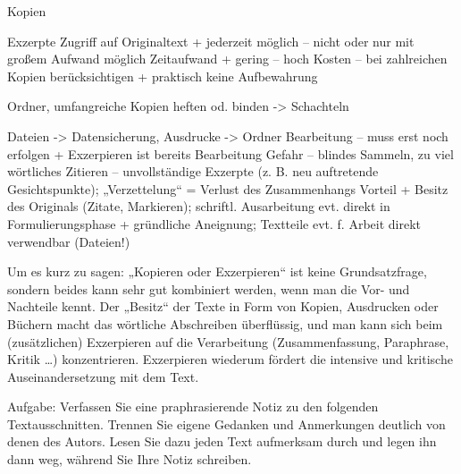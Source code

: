 \documentclass[]{book}
\theoremstyle{definition}
\theoremstyle{definition}
\theoremstyle{definition}
\theoremstyle{remark}
\begin{document}
Kopien

Exzerpte Zugriff auf Originaltext + jederzeit möglich -- nicht oder nur
mit großem Aufwand möglich Zeitaufwand + gering -- hoch Kosten -- bei
zahlreichen Kopien berücksichtigen + praktisch keine Aufbewahrung

Ordner, umfangreiche Kopien heften od. binden -\textgreater{} Schachteln

Dateien -\textgreater{} Datensicherung, Ausdrucke -\textgreater{} Ordner
Bearbeitung -- muss erst noch erfolgen + Exzerpieren ist bereits
Bearbeitung Gefahr -- blindes Sammeln, zu viel wörtliches Zitieren --
unvollständige Exzerpte (z. B. neu auftretende Gesichtspunkte);
„Verzettelung`` = Verlust des Zusammenhangs Vorteil + Besitz des
Originals (Zitate, Markieren); schriftl. Ausarbeitung evt. direkt in
Formulierungsphase + gründliche Aneignung; Textteile evt. f. Arbeit
direkt verwendbar (Dateien!)

Um es kurz zu sagen: „Kopieren oder Exzerpieren`` ist keine
Grundsatzfrage, sondern beides kann sehr gut kombiniert werden, wenn man
die Vor- und Nachteile kennt. Der „Besitz`` der Texte in Form von
Kopien, Ausdrucken oder Büchern macht das wörtliche Abschreiben
überflüssig, und man kann sich beim (zusätzlichen) Exzerpieren auf die
Verarbeitung (Zusammenfassung, Paraphrase, Kritik \ldots{})
konzentrieren. Exzerpieren wiederum fördert die intensive und kritische
Auseinandersetzung mit dem Text.

Aufgabe: Verfassen Sie eine praphrasierende Notiz zu den folgenden
Textausschnitten. Trennen Sie eigene Gedanken und Anmerkungen deutlich
von denen des Autors. Lesen Sie dazu jeden Text aufmerksam durch und
legen ihn dann weg, während Sie Ihre Notiz schreiben.
\end{document}
